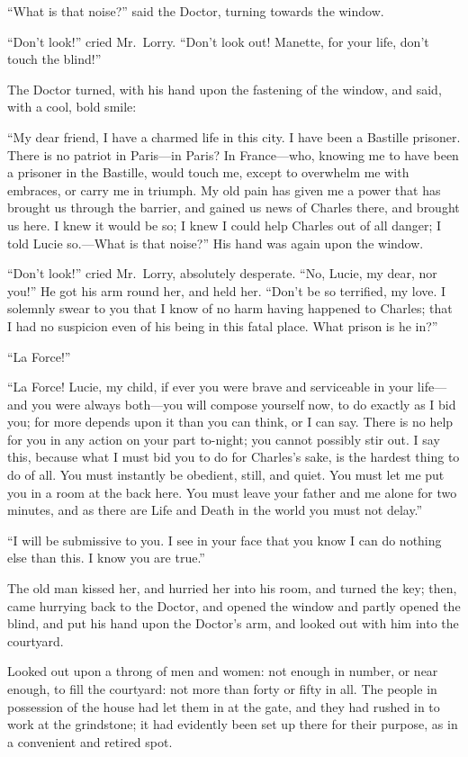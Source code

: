 ``What is that noise?'' said the Doctor, turning towards the window.

``Don't look!'' cried Mr.\ Lorry.  ``Don't look out!  Manette,
for your life, don't touch the blind!''

The Doctor turned, with his hand upon the fastening of the window,
and said, with a cool, bold smile:

``My dear friend, I have a charmed life in this city.  I have been a
Bastille prisoner.  There is no patriot in Paris---in Paris?  In
France---who, knowing me to have been a prisoner in the Bastille,
would touch me, except to overwhelm me with embraces, or carry me in
triumph.  My old pain has given me a power that has brought us
through the barrier, and gained us news of Charles there, and brought
us here.  I knew it would be so; I knew I could help Charles out of
all danger; I told Lucie so.---What is that noise?'' His hand was again
upon the window.

``Don't look!'' cried Mr.\ Lorry, absolutely desperate.  ``No, Lucie, my
dear, nor you!''  He got his arm round her, and held her.  ``Don't be so
terrified, my love.  I solemnly swear to you that I know of no harm
having happened to Charles; that I had no suspicion even of his being
in this fatal place.  What prison is he in?''

``La Force!''

``La Force!  Lucie, my child, if ever you were brave and serviceable in
your life---and you were always both---you will compose yourself now,
to do exactly as I bid you; for more depends upon it than you can think,
or I can say.  There is no help for you in any action on your part
to-night; you cannot possibly stir out.  I say this, because what I
must bid you to do for Charles's sake, is the hardest thing to do of all.
You must instantly be obedient, still, and quiet.  You must let me
put you in a room at the back here.  You must leave your father and
me alone for two minutes, and as there are Life and Death in the
world you must not delay.''

``I will be submissive to you.  I see in your face that you know I can
do nothing else than this.  I know you are true.''

The old man kissed her, and hurried her into his room, and turned the
key; then, came hurrying back to the Doctor, and opened the window
and partly opened the blind, and put his hand upon the Doctor's arm,
and looked out with him into the courtyard.

Looked out upon a throng of men and women:  not enough in number, or
near enough, to fill the courtyard:  not more than forty or fifty in
all.  The people in possession of the house had let them in at the
gate, and they had rushed in to work at the grindstone; it had
evidently been set up there for their purpose, as in a convenient and
retired spot.

